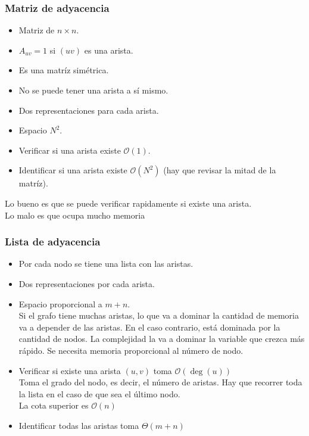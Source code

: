\documentclass[12pt, fleqn]{article}
\theoremstyle{definition}
\begin{document}
            \subsubsection{Matriz de adyacencia}
                \begin{itemize}
                    \item Matriz de $n \times n$.
                    \item $A_{uv} = 1$ si $(uv)$ es una arista.
                    \item Es una matríz simétrica.
                    \item No se puede tener una arista a sí mismo.
                    \item Dos representaciones para cada arista.
                    \item Espacio $N^2$.
                    \item Verificar si una arista existe $\mathcal{O}(1)$. 
                    \item Identificar si una arista existe $\mathcal{O}(N^2)$ (hay que revisar la mitad de la matríz).
                \end{itemize}
                Lo bueno es que se puede verificar rapidamente si existe una arista.\\
                Lo malo es que ocupa mucho memoria
            \subsubsection{Lista de adyacencia}
                \begin{itemize}
                    \item Por cada nodo se tiene una lista con las aristas.
                    \item Dos representaciones por cada arista.
                    \item Espacio proporcional a $m+n$.\\ 
                        Si el grafo tiene muchas aristas, lo que va a dominar la cantidad de memoria va a depender de las aristas.
                        En el caso contrario, está dominada por la cantidad de nodos. La complejidad la va a dominar la variable que crezca más rápido.
                        Se necesita memoria proporcional al número de nodo.
                    \item Verificar si existe una arista $(u,v)$ toma $\mathcal{O}(\deg(u))$\\
                        Toma el grado del nodo, es decir, el número de aristas. Hay que recorrer toda la lista en el caso de que sea el último nodo.\\
                        La cota superior es $\mathcal{O}(n)$
                    \item Identificar todas las aristas toma $\Theta(m + n)$
                \end{itemize}
\end{document}
